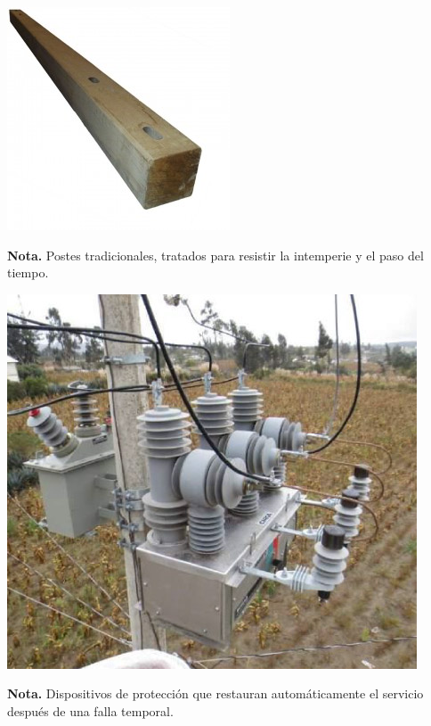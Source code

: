 \vspace{1cm}

\noindent
\begin{minipage}[t]{0.48\textwidth}
    \centering
    \includegraphics[width=\linewidth]{fotosherrajes/postes maderas.jpg}
    \footnotesize
    \raggedright
    \textbf{Nota.} Postes tradicionales, tratados para resistir la intemperie y el paso del tiempo.
\end{minipage}%
\hfill
\begin{minipage}[t]{0.48\textwidth}
    \centering
    \includegraphics[width=\linewidth]{fotosherrajes/reconectadores.jpg}
    \footnotesize
    \raggedright
    \textbf{Nota.} Dispositivos de protección que restauran automáticamente el servicio después de una falla temporal.
\end{minipage}


